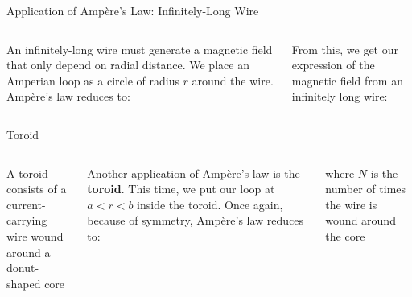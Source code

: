 \documentclass[12pt,aspectratio=169]{beamer}
\begin{document}
\begin{frame}{Application of Amp\`{e}re's Law: Infinitely-Long Wire}
  \begin{columns}

    An infinitely-long wire must generate a magnetic field that only depend on
    radial distance. We place an Amperian loop as a circle of radius $r$ around
    the wire. Amp\`{e}re's law reduces to:

      
    \vspace{-.1in}From this, we get our expression of the magnetic field from
    an infinitely long wire:
      
  \end{columns}
\end{frame}



\begin{frame}{Toroid}
  \begin{columns}

    {\scriptsize A toroid consists of a current-\\
      carrying wire wound around a donut-shaped core \par}
    
    Another application of Amp\`{e}re's law is the \textbf{toroid}. This time,
    we put our loop at $a<r<b$ inside the toroid. Once again, because of
    symmetry, Amp\`{e}re's law reduces to:


    where $N$ is the number of times the wire is wound around the core
  \end{columns}
\end{frame}
\end{document}
